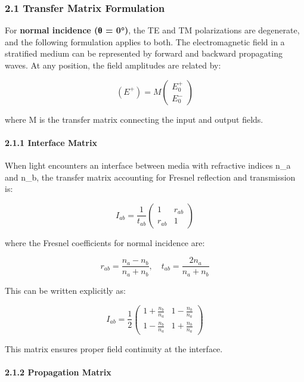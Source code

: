 \documentclass[
]{article}
\begin{document}
\subsubsection{2.1 Transfer Matrix
Formulation}\label{transfer-matrix-formulation}

For \textbf{normal incidence (θ = 0°)}, the TE and TM polarizations are
degenerate, and the following formulation applies to both. The
electromagnetic field in a stratified medium can be represented by
forward and backward propagating waves. At any position, the field
amplitudes are related by:

\[(E^+) = M \begin{pmatrix} E_0^+ \\ E_0^- \end{pmatrix}\]

where M is the transfer matrix connecting the input and output fields.

\paragraph{2.1.1 Interface Matrix}\label{interface-matrix}

When light encounters an interface between media with refractive indices
n\_a and n\_b, the transfer matrix accounting for Fresnel reflection and
transmission is:

\[I_{ab} = \frac{1}{t_{ab}}\begin{pmatrix} 1 & r_{ab} \\ r_{ab} & 1 \end{pmatrix}\]

where the Fresnel coefficients for normal incidence are:

\[r_{ab} = \frac{n_a - n_b}{n_a + n_b}, \quad t_{ab} = \frac{2n_a}{n_a + n_b}\]

This can be written explicitly as:

\[I_{ab} = \frac{1}{2}\begin{pmatrix} 1 + \frac{n_b}{n_a} & 1 - \frac{n_b}{n_a} \\ 1 - \frac{n_b}{n_a} & 1 + \frac{n_b}{n_a} \end{pmatrix}\]

This matrix ensures proper field continuity at the interface.

\paragraph{2.1.2 Propagation Matrix}\label{propagation-matrix}
\end{document}
